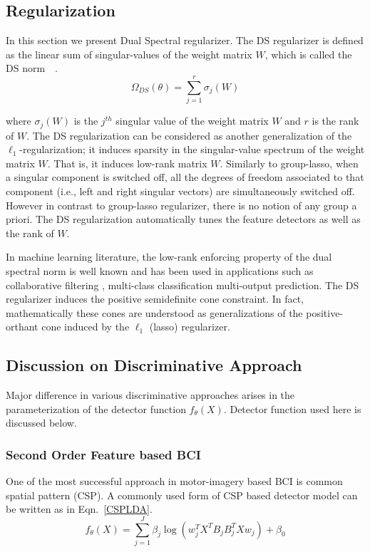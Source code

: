 \subsection{Regularization}

In this section we present Dual Spectral regularizer. The DS regularizer is defined as the linear sum of singular-values of the weight matrix $W$, which is called the DS norm~\cite{25}~\cite{26}.
\begin{equation}
\Omega_{DS}\left(\theta\right)=\sum_{j=1}^r \sigma_j\left(W\right)
\end{equation}

where $\sigma_j(W)$ is the $j^{th}$ singular value of the weight matrix $W$ and $r$ is the rank of $W$. The DS regularization can be considered as another generalization of the $\ell_1$-regularization; it induces sparsity in the singular-value spectrum of the weight matrix $W$. That is, it induces low-rank matrix $W$. Similarly to group-lasso, when a singular component is switched off, all the degrees of freedom associated to that component (i.e., left and right singular vectors) are simultaneously switched off. However in contrast to group-lasso regularizer, there is no notion of any group a priori. The DS regularization automatically tunes the feature detectors as well as the rank of $W$.
 
In machine learning literature, the low-rank enforcing property of the dual spectral norm is well known and has been used in applications such as collaborative filtering , multi-class classification multi-output prediction. The DS regularizer induces the positive semidefinite cone constraint. In fact, mathematically these cones are understood as generalizations of the positive-orthant cone induced by the $\ell_1$ (lasso) regularizer.
 
\subsection{Discussion on  Discriminative Approach}

Major difference in various discriminative approaches arises in the parameterization of the detector function $f_\theta (X)$. Detector function used here is discussed below.

\subsubsection{Second Order Feature based BCI }

One of the most successful approach in motor-imagery based BCI is common spatial pattern (CSP). A commonly used form of CSP based detector model can be written as in Eqn.~\ref{CSPLDA}.
\begin{equation}
f_\theta\left(X\right)=\sum_{j=1}^J \beta_j\log\left(w_j^T X^T B_j B_j^T X w_j\right)+\beta_0
\end{equation}\label{CSPLDA}

